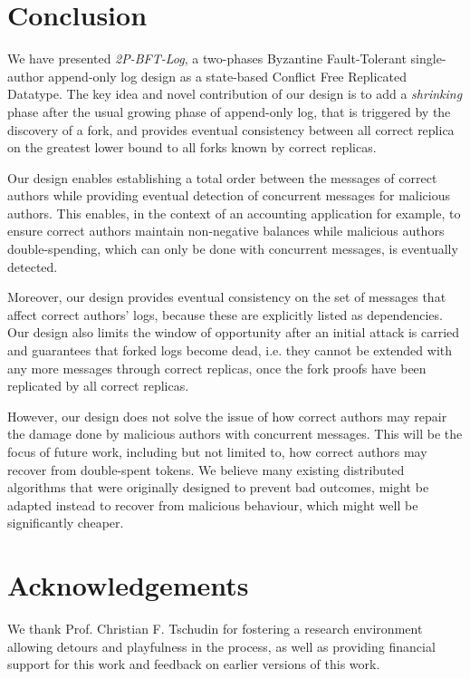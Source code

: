 \documentclass[9pt, oneside]{article}   	%
\begin{document}
\section{Conclusion}
\label{sec:conclusion}

We have presented \textit{2P-BFT-Log}, a two-phases Byzantine Fault-Tolerant single-author append-only log design as a state-based Conflict Free Replicated Datatype. The key idea and novel contribution of our design is to add a \textit{shrinking} phase after the usual growing phase of append-only log, that is triggered by the discovery of a fork, and provides eventual consistency between all correct replica on the greatest lower bound to all forks known by correct replicas.

Our design enables establishing a total order between the messages of correct authors while providing eventual detection of concurrent messages for malicious authors. This enables, in the context of an accounting application for example, to ensure correct authors maintain non-negative balances while malicious authors double-spending, which can only be done with concurrent messages, is eventually detected.

Moreover, our design provides eventual consistency on the set of messages that affect correct authors' logs, because these are explicitly listed as dependencies. Our design also limits the window of opportunity after an initial attack is carried and guarantees that forked logs become dead, i.e. they cannot be extended with any more messages through correct replicas, once the fork proofs have been replicated by all correct replicas.

However, our design does not solve the issue of how correct authors may repair the damage done by malicious authors with concurrent messages. This will be the focus of future work, including but not limited to, how correct authors may recover from double-spent tokens. We believe many existing distributed algorithms that were originally designed to prevent bad outcomes, might be adapted instead to recover from malicious behaviour, which might well be significantly cheaper.

\section{Acknowledgements}
\label{sec:acknowledgements}

We thank Prof. Christian F. Tschudin for fostering a research environment allowing detours and playfulness in the process, as well as providing financial support for this work and feedback on earlier versions of this work. 
\end{document}

